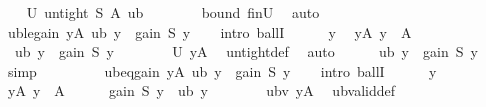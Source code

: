 \begin{isabellebody}
\isanewline
\ \ \isamarkupfalse%
\ U{}{\isacharcolon}{\kern0pt}\ {\isachardoublequoteopen}untight\ S\ A\ ub\ {\isacharequal}{\kern0pt}\ {\isacharbraceleft}{\kern0pt}{\isacharbraceright}{\kern0pt}{\isachardoublequoteclose}\isanewline
\ \ \ \ \isamarkupfalse%
\ bound\ finU\ \isamarkupfalse%
\ auto\isanewline
\ \ \ \ \isanewline
\ \ \isamarkupfalse%
\ ub{\isacharunderscore}{\kern0pt}le{\isacharunderscore}{\kern0pt}gain{\isacharcolon}{\kern0pt}\ {\isachardoublequoteopen}{\isasymforall}y{\isasymin}A{\isachardot}{\kern0pt}\ ub\ y\ {\isasymle}\ gain\ S\ y{\isachardoublequoteclose}\isanewline
\ \ \isamarkupfalse%
\ {\isacharparenleft}{\kern0pt}intro\ ballI{\isacharparenright}{\kern0pt}\isanewline
\ \ \ \ \isamarkupfalse%
\ y\ \isamarkupfalse%
\ yA{\isacharcolon}{\kern0pt}\ {\isachardoublequoteopen}y\ {\isasymin}\ A{\isachardoublequoteclose}\isanewline
\ \ \ \ \isamarkupfalse%
\ {\isachardoublequoteopen}{\isasymnot}\ {\isacharparenleft}{\kern0pt}ub\ y\ {\isachargreater}{\kern0pt}\ gain\ S\ y{\isacharparenright}{\kern0pt}{\isachardoublequoteclose}\isanewline
\ \ \ \ \ \ \isamarkupfalse%
\ U{}\ yA\ \isamarkupfalse%
\ untight{\isacharunderscore}{\kern0pt}def\ \isamarkupfalse%
\ auto\isanewline
\ \ \ \ \isamarkupfalse%
\ {\isachardoublequoteopen}ub\ y\ {\isasymle}\ gain\ S\ y{\isachardoublequoteclose}\ \isamarkupfalse%
\ simp\isanewline
\ \ \isamarkupfalse%
\isanewline
\ \ \isanewline
\ \ \isamarkupfalse%
\ ub{\isacharunderscore}{\kern0pt}eq{\isacharunderscore}{\kern0pt}gain{\isacharcolon}{\kern0pt}\ {\isachardoublequoteopen}{\isasymforall}y{\isasymin}A{\isachardot}{\kern0pt}\ ub\ y\ {\isacharequal}{\kern0pt}\ gain\ S\ y{\isachardoublequoteclose}\isanewline
\ \ \isamarkupfalse%
\ {\isacharparenleft}{\kern0pt}intro\ ballI{\isacharparenright}{\kern0pt}\isanewline
\ \ \ \ \isamarkupfalse%
\ y\ \isamarkupfalse%
\ yA{\isacharcolon}{\kern0pt}\ {\isachardoublequoteopen}y\ {\isasymin}\ A{\isachardoublequoteclose}\isanewline
\ \ \ \ \isamarkupfalse%
\ {\isachardoublequoteopen}gain\ S\ y\ {\isasymle}\ ub\ y{\isachardoublequoteclose}\isanewline
\ \ \ \ \ \ \isamarkupfalse%
\ ubv\ yA\ \isamarkupfalse%
\ ub{\isacharunderscore}{\kern0pt}valid{\isacharunderscore}{\kern0pt}def\ \isamarkupfalse%

\end{isabellebody}
